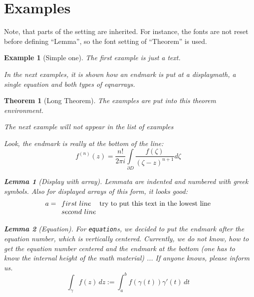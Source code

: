 \documentclass{article}
\theoremstyle{marginbreak}
\newtheorem{Theorem}{Theorem}
\theoremstyle{changebreak}
\newtheorem{Lemma}{Lemma}
\theoremstyle{change}
\newtheorem{Example}{Example}
\theoremstyle{plain}
\theoremstyle{nonumberplain}
\begin{document}

\section{Examples}
Note, that parts of the setting are inherited. For instance, the
fonts are not reset before defining ``Lemma'', so the font setting 
of ``Theorem'' is used.

\begin{Example}[Simple one]
 The first example is just a text. 

 In the next examples, it is shown how an endmark is put at a
 displaymath, a single equation and both types of eqnarrays.
\end{Example}

\begin{Theorem}[Long Theorem]
 The examples are put into this theorem environment. 

The next example will not appear in the list of examples
\begin{Example*}
Look, the endmark is really at the bottom of the line:
\[ f^{(n)}(z) =
   \frac{n!}{2\pi i} \int \limits _{\partial D}
            \frac{f(\zeta)}{(\zeta-z)^{n+1}} d\zeta \]
\end{Example*}

\begin{Lemma}[Display with array]
Lemmata are indented and numbered with greek symbols.
Also for displayed arrays of this form, it looks good:
\[\begin{array}{l}
     a = \begin{array}[t]{l}
           first\ line \\
           second\ line
         \end{array} \mbox{try to put this text in the lowest line}
  \end{array}\]
\end{Lemma}
\begin{Lemma}[Equation]
For \verb|equation|s, we decided to put the endmark after the equation
number, which is vertically centered.
Currently, we do not know, how to get the equation number centered and
the endmark at the bottom (one has to know the internal height of the
math material) ... If anyone knows, please inform us.
\begin{equation}
 \int_{\gamma} f(z)\, dz := \int_a^b f(\gamma (t)) \gamma'(t) \, dt
\end{equation}
\end{Lemma}


\end{Theorem}
\end{document}
